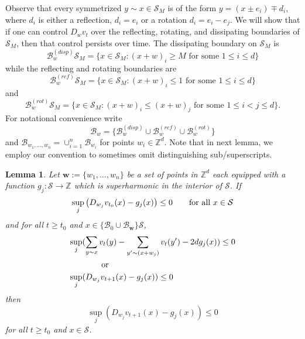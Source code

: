 \documentclass[12pt]{amsart}
\newtheorem{lemma}[theorem]{Lemma}
\newcommand{\Z}{\mathbb{Z}}
\begin{document}
	
	Observe that every symmetrized $y \sim x \in \mathcal{S}_M$ is of the form $y = (x \pm e_i) \mp d_i$,  where $d_i$ is either a reflection, $d_i = e_i$ or a 
	rotation $d_i = e_i -e_j$. We will show that if one can control $D_{w} v_t$ over the reflecting, rotating, and dissipating boundaries of $\mathcal{S}_M$, then that control persists over time. The dissipating boundary on $\mathcal{S}_M$ is
	\begin{equation} \label{eq:dissipative_boundary}
	\mathcal{B}^{(disp)}_w \mathcal{S}_M = \{ x \in \mathcal{S}_M : (x + w)_{i} \geq M  \mbox{ for some $1 \leq i \leq d$} \}
	\end{equation}
	while the reflecting and rotating boundaries are  
	\begin{equation} \label{eq:reflecting_boundary}
	\mathcal{B}^{(ref)}_w \mathcal{S}_M = \{ x \in \mathcal{S}_M : (x+w)_{i} \leq 1 \mbox{ for some $1 \leq i \leq d$} \}
	\end{equation}
	and
	\begin{equation} \label{eq:rotating_boundary}
	\mathcal{B}^{(rot)}_w \mathcal{S}_M = \{ x \in \mathcal{S}_M : (x+w)_i \leq (x + w)_j \mbox{ for some $1 \leq i < j \leq d$} \}.
	\end{equation}
	For notational convenience write
	\begin{equation} \label{eq:all_boundaries}
	\mathcal{B}_w = \{\mathcal{B}^{(disp)}_{w}  \cup \mathcal{B}^{(ref)}_{w} \cup \mathcal{B}^{(rot)}_{w} \}
	\end{equation}
	and  $\mathcal{B}_{w_1, \ldots, w_n} = \cup_{i=1}^n \mathcal{B}_{w_i}$
	for points $w_i \in \Z^d$. 
		Note that in next lemma, we employ our convention to sometimes omit distinguishing sub/superscripts. 
	
	\begin{lemma} \label{general_difference_comparison}
		Let  $\mathbf{w} := \{w_1, \ldots, w_n\}$ be a set of points in $\Z^d$ each equipped with a function $g_j: \mathcal{S} \to \Z$ which is superharmonic in the interior of $\mathcal{S}$. If	
		\begin{equation}
		\label{eq:initial_cond} \sup_{j} \left( D_{w_j} v_{t_0}(x) - g_j(x) \right)  \leq 0 \mbox{\qquad for all $x \in \mathcal{S}$}
		\end{equation}
		and for all $t \geq t_0$ and $x \in \{\mathcal{B}_0 \cup \mathcal{B}_{\mathbf{w}}\} \mathcal{S}$,
		\begin{equation} \label{eq:boundaries_ref}
		\begin{aligned}
		\sup_{j} &( \sum_{y \sim x} v_{t}(y) - \sum_{y' \sim (x + w_j)} v_{t}(y') -  2 d g_j(x) ) \leq 0 \\
		&\mbox{  \qquad or } \\
		\sup_{j}  &( D_{w_j} v_{t+1}(x) - g_j(x) ) \leq 0
		 \end{aligned}
		\end{equation}
		then
		\begin{equation} \label{eq:derivative_comparison}
		\sup_{j} \left( D_{w_j} v_{t+1}(x) - g_j(x) \right) \leq 0
		\end{equation}
		for all $t \geq t_0$ and $x \in \mathcal{S}$. 
		
	\end{lemma}
	
\end{document}

